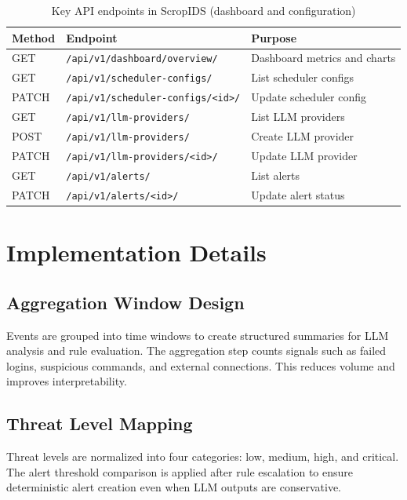 \documentclass[conference]{IEEEtran}
\begin{document}
\begin{table}[!t]
\centering
\caption{Key API endpoints in ScropIDS (dashboard and configuration)}
\label{tab:api-dashboard}
\small
\begin{tabularx}{\columnwidth}{l l X}
\toprule
\textbf{Method} & \textbf{Endpoint} & \textbf{Purpose} \\
\midrule
GET & \texttt{/api/v1/dashboard/overview/} & Dashboard metrics and charts \\
GET & \texttt{/api/v1/scheduler-configs/} & List scheduler configs \\
PATCH & \texttt{/api/v1/scheduler-configs/\textless id\textgreater/} & Update scheduler config \\
GET & \texttt{/api/v1/llm-providers/} & List LLM providers \\
POST & \texttt{/api/v1/llm-providers/} & Create LLM provider \\
PATCH & \texttt{/api/v1/llm-providers/\textless id\textgreater/} & Update LLM provider \\
GET & \texttt{/api/v1/alerts/} & List alerts \\
PATCH & \texttt{/api/v1/alerts/\textless id\textgreater/} & Update alert status \\
\bottomrule
\end{tabularx}
\end{table}
\FloatBarrier

\section{Implementation Details}
\subsection{Aggregation Window Design}
Events are grouped into time windows to create structured summaries for LLM analysis and rule evaluation. The aggregation step counts signals such as failed logins, suspicious commands, and external connections. This reduces volume and improves interpretability.

\subsection{Threat Level Mapping}
Threat levels are normalized into four categories: low, medium, high, and critical. The alert threshold comparison is applied after rule escalation to ensure deterministic alert creation even when LLM outputs are conservative.
\end{document}

